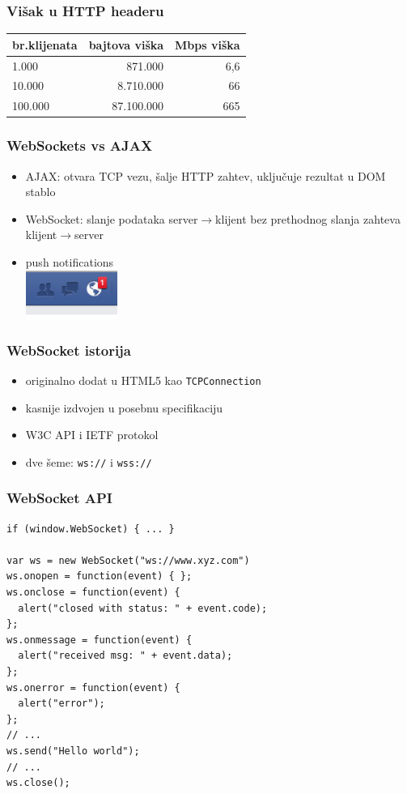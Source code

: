 \documentclass[compress]{beamer}
\begin{document}
\begin{frame}
  \frametitle{Višak u HTTP headeru}
\begin{center}
\begin{tabular}{l|r|r}
\textbf{br.klijenata} & \textbf{bajtova viška} & \textbf{Mbps viška} \\ \hline \hline
1.000 & 871.000 & ~6,6 \\ \hline
10.000 & 8.710.000 & ~66 \\ \hline
100.000 & 87.100.000 & ~665 \\ \hline
\end{tabular}
\end{center}
\end{frame}

\begin{frame}
  \frametitle{WebSockets vs AJAX}
  \begin{itemize}
    \item AJAX: otvara TCP vezu, šalje HTTP zahtev, uključuje rezultat u DOM stablo
    \item WebSocket: slanje podataka server$\rightarrow$klijent bez prethodnog 
    slanja zahteva klijent$\rightarrow$server
    \item push notifications \\
      \includegraphics[width=3cm]{facebook.png}
  \end{itemize}
\end{frame}

\begin{frame}
  \frametitle{WebSocket istorija}
  \begin{itemize}
    \item originalno dodat u HTML5 kao \texttt{TCPConnection}
    \item kasnije izdvojen u posebnu specifikaciju
    \item W3C API i IETF protokol
    \item dve šeme: \texttt{ws://} i \texttt{wss://}
  \end{itemize}
\end{frame}

\begin{frame}[fragile,shrink=10]
  \frametitle{WebSocket API}
\begin{verbatim}
if (window.WebSocket) { ... }

var ws = new WebSocket("ws://www.xyz.com")
ws.onopen = function(event) { };
ws.onclose = function(event) { 
  alert("closed with status: " + event.code);
};
ws.onmessage = function(event) { 
  alert("received msg: " + event.data);
};
ws.onerror = function(event) { 
  alert("error");
};
// ...
ws.send("Hello world");
// ...
ws.close();
\end{verbatim}
\end{frame}
\end{document}
